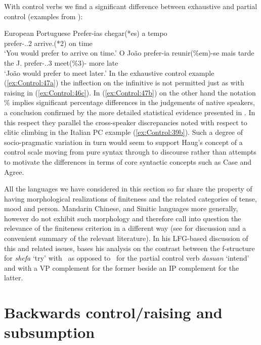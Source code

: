 \documentclass[output=paper,hidelinks]{langscibook}
\begin{document}
With control verbs we find a significant difference between exhaustive and partial control (examples from \citealt[429]{MadeiraFieis2020}):

\ea\label{ex:Control:47}European Portuguese
\ea\label{ex:Control:47a}\gll  Prefer-ias     chegar(*es)   a  tempo\\
{prefer-\IND.\IPFV.2\SG}  arrive.\INF(*2\SG) on  time\\
\glt`You would prefer to arrive on time.'
\ex\label{ex:Control:47b}\gll  O  Jo{\~a}o prefer-ia      reunir(\%em)-se  mais tarde\\
    the J.  {prefer-\IND.\IPFV.3\SG}  {meet(\%3\PL)-\RECP} more late\\
\glt    `Jo{\~a}o would prefer to meet later.'
\z\z
In the exhaustive control example (\ref{ex:Control:47a}) the inflection on the infinitive is not permitted just as with raising in (\ref{ex:Control:46c}). In (\ref{ex:Control:47b}) on the other hand the notation \% implies significant percentage differences in the judgements of native speakers, a conclusion confirmed by the more detailed statistical evidence presented in \citet{Sheehan2018b,Sheehan2018}. In this respect they parallel the cross-speaker discrepancies noted with respect to clitic climbing in the Italian PC example (\ref{ex:Control:39b}). Such a degree of socio-pragmatic variation in turn would seem to support Haug's concept of a control scale moving from pure syntax through to discourse rather than attempts to motivate the differences in terms of core syntactic concepts such as Case and Agree.

All the languages we have considered in this section so far share the property of having morphological realizations of finiteness and the related categories of tense, mood and person. Mandarin Chinese, and Sinitic languages more generally, however do not exhibit such morphology and therefore call into question the relevance of the finiteness criterion in a different way (see \citealt[chapter~6]{Grano2015} for discussion and a convenient summary of the relevant literature). In his LFG-based discussion of this and related issues, \citet{Lam2022} bases his analysis on the contrast between the f-structure for \emph{shefa} `try' with \XCOMP\ as opposed to \COMP\ for the partial control verb \emph{dasuan} `intend' and with a VP complement for the former beside an IP complement for the latter.

\section{Backwards control/raising and subsumption }
\label{sec:Control:7}
\end{document}
